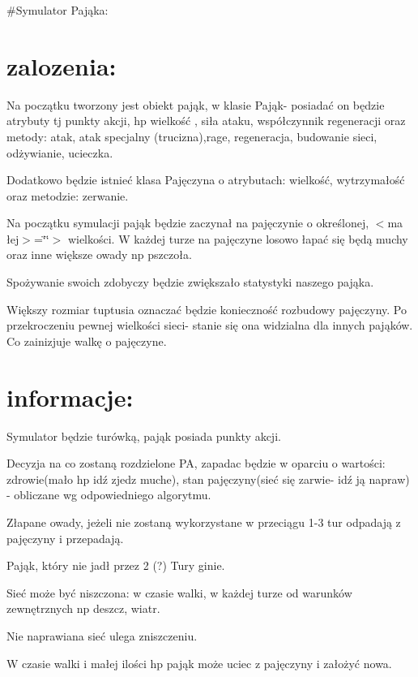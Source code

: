 \#\+Symulator Pająka\+:\hypertarget{md_README_Podstawowe}{}\section{zalozenia\+:}\label{md_README_Podstawowe}

\begin{DoxyItemize}
\item Na początku tworzony jest obiekt pająk, w klasie Pająk-\/ posiadać on będzie atrybuty tj punkty akcji, hp wielkość , siła ataku, współczynnik regeneracji oraz metody\+: atak, atak specjalny (trucizna),rage, regeneracja, budowanie sieci, odżywianie, ucieczka.
\item Dodatkowo będzie istnieć klasa Pajęczyna o atrybutach\+: wielkość, wytrzymałość oraz metodzie\+: zerwanie.
\item Na początku symulacji pająk będzie zaczynał na pajęczynie o określonej, $<$ma łej$>$=\char`\"{}\char`\"{}$>$ wielkości. W każdej turze na pajęczyne losowo łapać się będą muchy oraz inne większe owady np pszczoła.
\item Spożywanie swoich zdobyczy będzie zwiększało statystyki naszego pająka.
\item Większy rozmiar tuptusia oznaczać będzie konieczność rozbudowy pajęczyny. Po przekroczeniu pewnej wielkości sieci-\/ stanie się ona widzialna dla innych pająków. Co zainizjuje walkę o pajęczyne.
\end{DoxyItemize}\hypertarget{md_README_Dodatkowe}{}\section{informacje\+:}\label{md_README_Dodatkowe}

\begin{DoxyItemize}
\item Symulator będzie turówką, pająk posiada punkty akcji.
\item Decyzja na co zostaną rozdzielone PA, zapadac będzie w oparciu o wartości\+: zdrowie(mało hp idź zjedz muche), stan pajęczyny(sieć się zarwie-\/ idź ją napraw) -\/ obliczane wg odpowiedniego algorytmu.
\item Złapane owady, jeżeli nie zostaną wykorzystane w przeciągu 1-\/3 tur odpadają z pajęczyny i przepadają.
\item Pająk, który nie jadł przez 2 (?) Tury ginie.
\item Sieć może być niszczona\+: w czasie walki, w każdej turze od warunków zewnętrznych np deszcz, wiatr.
\item Nie naprawiana sieć ulega zniszczeniu.
\item W czasie walki i małej ilości hp pająk może uciec z pajęczyny i założyć nowa. 
\end{DoxyItemize}